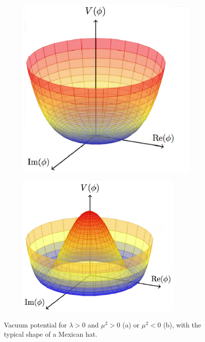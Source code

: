 \begin{figure}[t!]
  \centering
   \begin{subfigure}{0.47\textwidth}
  \includegraphics[width=\textwidth]{Theory/Figures/higgs1}
  \caption{}
   \end{subfigure}
   \begin{subfigure}{0.47\textwidth}
  \includegraphics[width=0.9\textwidth]{Theory/Figures/higgs2}
  \caption{}
   \end{subfigure}
  \caption{Vacuum potential for $\lambda > 0$ and $\mu^2 > 0$ (a) or $\mu^2 < 0$ (b), with the typical shape of a Mexican hat.}
  \label{fig:Higgs_potential}
\end{figure}
